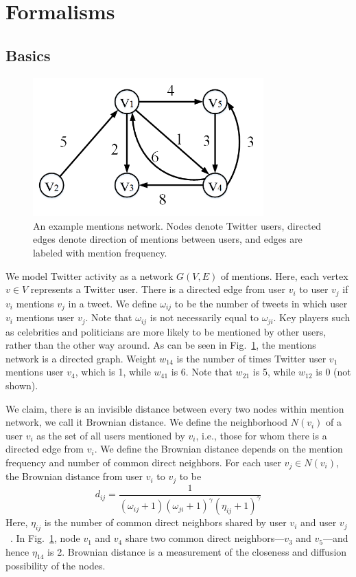 
\section{Formalisms}

\subsection{Basics}
\begin{figure}[th]
\centering
\includegraphics[width=3.5in]{figures/mention_network.png} %
\caption{An example mentions network. Nodes denote Twitter users,
directed edges denote direction of mentions between users, and edges
are labeled with mention frequency.}
\label{fig:mention_network}
\end{figure}

We model Twitter activity as a network $G(V,E)$ of mentions.
Here, each vertex $v \in V$ represents a Twitter user.
There is a directed edge from user $v_i$ to user $v_j$
if $v_i$ mentions $v_j$ in
a tweet.
We define $\omega_{ij}$ to be the number of tweets in which user $v_i$ mentions user $v_j$. Note that $\omega_{ij}$ is not necessarily equal to $\omega_{ji}$.
Key players such as celebrities and politicians are more
likely to be mentioned by other users, rather than the other way around.
As can be seen in Fig.~\ref{fig:mention_network}, the mentions network
is a directed graph. Weight $w_{14}$ is the number of times Twitter user $v_1$ mentions user $v_4$, which is 1, while $w_{41}$ is 6. Note
that $w_{21}$ is 5, while $w_{12}$ is 0 (not shown).

We claim, there is an invisible distance between every two nodes within mention network, we call it Brownian distance.
We define the neighborhood $N(v_i)$ of a user $v_i$ as the set of all users
mentioned by $v_i$, i.e., those for whom there is a directed edge from $v_i$. We define the Brownian distance depends on the mention frequency and number of common direct neighbors. For each user $v_j \in N(v_i)$, the Brownian distance from user $v_i$ to $v_j$ to be 
\begin{equation}
 d_{ij}=\frac{1}{(\omega_{ij}+1)(\omega_{ji}+1)^\gamma(\eta_{ij}+1)^\gamma}
\end{equation}
Here, $\eta_{ij}$ is the number of common direct neighbors shared by user $v_i$ and user $v_j$~\cite{zhou2004network}. In Fig.~\ref{fig:mention_network}, node $v_1$ and $v_4$ share two common direct neighbors---$v_3$ and $v_5$---and hence $\eta_{14}$ is 2. Brownian distance is a measurement of the closeness and diffusion possibility of the nodes.

